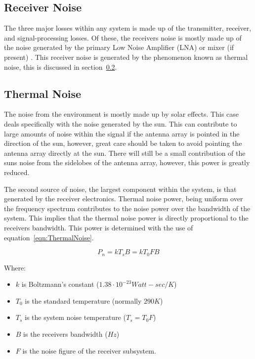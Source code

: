 \documentclass[11pt]{witseiepaper}
\begin{document}
\subsection{Receiver Noise} \label{sec:ReceiverNoise}
The three major losses within any system is made up of the transmitter, receiver, and signal-processing losses.
Of these, the receivers noise is mostly made up of the noise generated by the primary Low Noise Amplifier (LNA) or mixer (if present) \cite[p.~405]{radarHandbook}.
This receiver noise is generated by the phenomenon known as thermal noise, this is discussed in section~\ref{sec:ThermalNoise}.

\subsection{Thermal Noise} \label{sec:ThermalNoise}
The noise from the environment is mostly made up by solar effects. This case deals specifically with the noise generated by the sun. This can contribute to large amounts of noise within the signal if the antenna array is pointed in the direction of the sun, however, great care should be taken to avoid pointing the antenna array directly at the sun. There will still be a small contribution of the suns noise from the sidelobes of the antenna array, however, this power is greatly reduced.

The second source of noise, the largest component within the system, is that generated by the receiver electronics.
Thermal noise power, being uniform over the frequency spectrum contributes to the noise power over the bandwidth of the system. This implies that the thermal noise power is directly proportional to the receivers bandwidth. This power is determined with the use of equation~\ref{eqn:ThermalNoise}.

\begin{equation} \label{eqn:ThermalNoise}
P_{n} = k T_{s} B = k T_{0} F B
\end{equation}

Where:
\begin{itemize}
    \item $k$ is Boltzmann's constant ($1.38 \cdot 10^{-23} Watt-sec/K$)
    \item $T_{0}$ is the standard temperature (normally $290 K$)
    \item $T_{s}$ is the system noise temperature ($T_{s} = T_{0} F$)
    \item $B$ is the receivers bandwidth ($Hz$)
    \item $F$ is the noise figure of the receiver subsystem.
\end{itemize}
\end{document}
